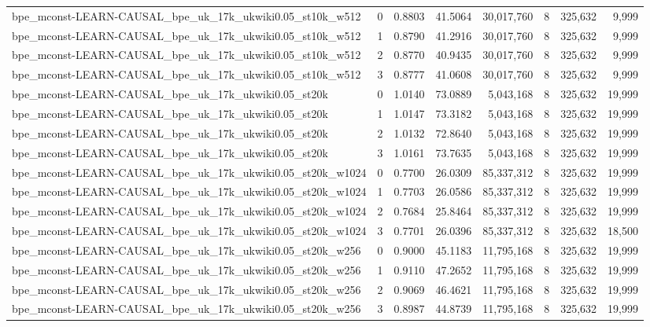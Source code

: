 \begin{tabular}{lrrrrrrr}
bpe\_mconst-LEARN-CAUSAL\_bpe\_uk\_17k\_ukwiki0.05\_st10k\_w512 & 0 & 0.8803 & 41.5064 & 30,017,760 & 8 & 325,632 & 9,999 \\
bpe\_mconst-LEARN-CAUSAL\_bpe\_uk\_17k\_ukwiki0.05\_st10k\_w512 & 1 & 0.8790 & 41.2916 & 30,017,760 & 8 & 325,632 & 9,999 \\
bpe\_mconst-LEARN-CAUSAL\_bpe\_uk\_17k\_ukwiki0.05\_st10k\_w512 & 2 & 0.8770 & 40.9435 & 30,017,760 & 8 & 325,632 & 9,999 \\
bpe\_mconst-LEARN-CAUSAL\_bpe\_uk\_17k\_ukwiki0.05\_st10k\_w512 & 3 & 0.8777 & 41.0608 & 30,017,760 & 8 & 325,632 & 9,999 \\
bpe\_mconst-LEARN-CAUSAL\_bpe\_uk\_17k\_ukwiki0.05\_st20k & 0 & 1.0140 & 73.0889 & 5,043,168 & 8 & 325,632 & 19,999 \\
bpe\_mconst-LEARN-CAUSAL\_bpe\_uk\_17k\_ukwiki0.05\_st20k & 1 & 1.0147 & 73.3182 & 5,043,168 & 8 & 325,632 & 19,999 \\
bpe\_mconst-LEARN-CAUSAL\_bpe\_uk\_17k\_ukwiki0.05\_st20k & 2 & 1.0132 & 72.8640 & 5,043,168 & 8 & 325,632 & 19,999 \\
bpe\_mconst-LEARN-CAUSAL\_bpe\_uk\_17k\_ukwiki0.05\_st20k & 3 & 1.0161 & 73.7635 & 5,043,168 & 8 & 325,632 & 19,999 \\
bpe\_mconst-LEARN-CAUSAL\_bpe\_uk\_17k\_ukwiki0.05\_st20k\_w1024 & 0 & 0.7700 & 26.0309 & 85,337,312 & 8 & 325,632 & 19,999 \\
bpe\_mconst-LEARN-CAUSAL\_bpe\_uk\_17k\_ukwiki0.05\_st20k\_w1024 & 1 & 0.7703 & 26.0586 & 85,337,312 & 8 & 325,632 & 19,999 \\
bpe\_mconst-LEARN-CAUSAL\_bpe\_uk\_17k\_ukwiki0.05\_st20k\_w1024 & 2 & 0.7684 & 25.8464 & 85,337,312 & 8 & 325,632 & 19,999 \\
bpe\_mconst-LEARN-CAUSAL\_bpe\_uk\_17k\_ukwiki0.05\_st20k\_w1024 & 3 & 0.7701 & 26.0396 & 85,337,312 & 8 & 325,632 & 18,500 \\
bpe\_mconst-LEARN-CAUSAL\_bpe\_uk\_17k\_ukwiki0.05\_st20k\_w256 & 0 & 0.9000 & 45.1183 & 11,795,168 & 8 & 325,632 & 19,999 \\
bpe\_mconst-LEARN-CAUSAL\_bpe\_uk\_17k\_ukwiki0.05\_st20k\_w256 & 1 & 0.9110 & 47.2652 & 11,795,168 & 8 & 325,632 & 19,999 \\
bpe\_mconst-LEARN-CAUSAL\_bpe\_uk\_17k\_ukwiki0.05\_st20k\_w256 & 2 & 0.9069 & 46.4621 & 11,795,168 & 8 & 325,632 & 19,999 \\
bpe\_mconst-LEARN-CAUSAL\_bpe\_uk\_17k\_ukwiki0.05\_st20k\_w256 & 3 & 0.8987 & 44.8739 & 11,795,168 & 8 & 325,632 & 19,999 \\

\end{tabular}
